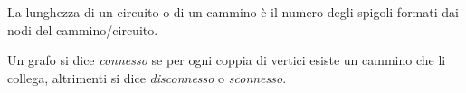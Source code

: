 \begin{defn}
La lunghezza di un circuito o di un cammino è il numero degli spigoli formati dai
nodi del cammino/circuito.
\end{defn}


\begin{defn}
Un grafo si dice \emph{connesso} se per ogni coppia di vertici esiste un cammino
che li collega, altrimenti si dice \emph{disconnesso} o \emph{sconnesso}.
\end{defn}

